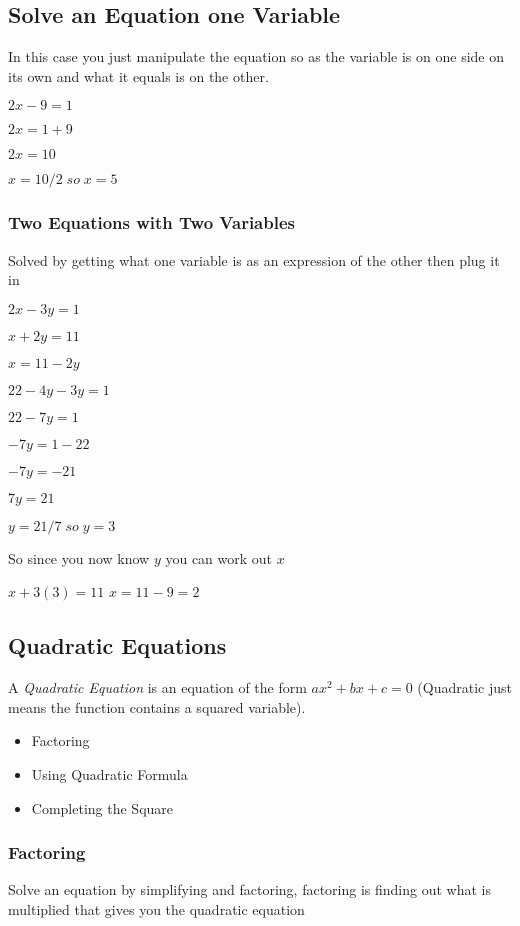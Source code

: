 \documentclass{article}
\begin{document}
\subsection{Solve an Equation one Variable}
In this case you just manipulate the equation so as the variable is on one side on its own and what it equals is on the other.

$2x - 9 = 1$

$2x = 1 + 9 $

$2x = 10 $

$x = 10 /2  \;so \; x = 5$

\subsubsection{Two Equations with Two Variables}
Solved by getting what one variable is as an expression of the other then plug it in

$2x -3y = 1 $  
       
$x + 2y = 11 $	     

$x = 11 -2y$

$22-4y -3y = 1$

$22 - 7y = 1$

$-7y = 1-22$

$-7y = -21$

$7y = 21$

$y =21/7   \;so \;  y = 3$

So since you now know $y$ you can work out $x$

$x + 3 (3) = 11$
$x = 11 -9 = 2$

\newpage
\subsection{Quadratic Equations}
A \textit{Quadratic Equation} is an equation of the form $ax^{2} + bx + c = 0$ (Quadratic just means the function contains a squared variable).

\begin{itemize}
\item Factoring
\item Using Quadratic Formula
\item Completing the Square
\end{itemize}

\subsubsection{Factoring}
Solve an equation by simplifying and factoring, factoring is finding out what is multiplied that gives you the quadratic equation
\end{document}
